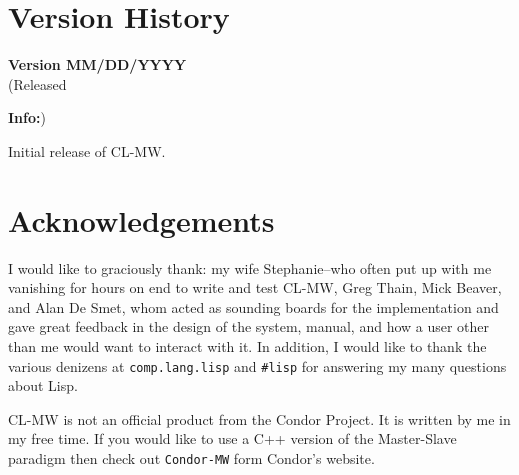 \documentclass[titlepage,12pt]{book}
\newcommand{\xsmall}{\latexhtml{\small}{}}
\newcommand{\xnormalsize}{\latexhtml{\normalsize}{}}
\newcommand{\mw}{Master-Slave\xspace}
\newcommand{\clmw}{\xsmall\textsc{CL-MW}\xnormalsize\xspace}
\newcommand{\bold}[1]{\textbf{#1}\xspace}
\newenvironment{verhist}[2]
	{\textbf{Version #1}\\\indent\xsmall(Released #2)\xnormalsize
	 \begin{itemize}}
	{\end{itemize}}
\newcommand{\info}{\item \bold{Info:}\xspace}
\begin{document}
\chapter{\label{version-history}Version History}

\begin{verhist}{0.1}{MM/DD/YYYY}
\info Initial release of \clmw.
\end{verhist}

\chapter{Acknowledgements}

I would like to graciously thank: my wife Stephanie--who often put
up with me vanishing for hours on end to write and test \clmw, Greg
Thain, Mick Beaver, and Alan De Smet, whom acted as sounding boards
for the implementation and gave great feedback in the design of the
system, manual, and how a user other than me would want to interact
with it. In addition, I would like to thank the various denizens at
\texttt{comp.lang.lisp} and \texttt{\#lisp} for answering my many
questions about Lisp.

\clmw is not an official product from the Condor Project. It is written
by me in my free time. If you would like to use a C++ version of the
\mw paradigm then check out \texttt{Condor-MW} form Condor's website.

\backmatter
\end{document}
